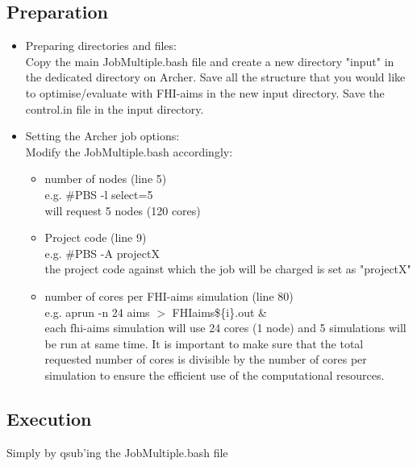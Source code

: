 \documentclass[12pt]{article}
\begin{document}
\subsection{Preparation}
\begin{itemize}
  \item Preparing directories and files: \\
  Copy the main JobMultiple.bash file and create a new directory "input" in the dedicated directory on Archer. 
  Save all the structure that you would like to optimise/evaluate with FHI-aims in the new input directory. 
  Save the control.in file in the input directory.
  \item Setting the Archer job options: \\
  Modify the JobMultiple.bash accordingly:
  \begin{itemize}
  
  \item number of nodes (line 5) \\
  e.g. \#PBS -l select=5 \\
  will request 5 nodes (120 cores)
  
  \item Project code (line 9) \\
  e.g. \#PBS -A projectX
  \\ the project code against which the job will be charged is set as "projectX"
  
  \item number of cores per FHI-aims simulation (line 80) \\
  e.g. aprun -n 24 aims $>$ FHIaims\$\{i\}.out \&
  \\  each fhi-aims simulation will use 24 cores (1 node) and 5 simulations will be run at same time. It is important to make sure that the total requested number of cores is divisible by the number of cores per simulation to ensure the efficient use of the computational resources.
  
  \end{itemize}
\end{itemize}

\subsection{Execution}

Simply by qsub'ing the JobMultiple.bash file
\end{document}
